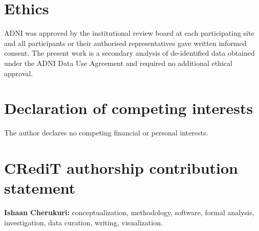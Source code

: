 \documentclass[blue]{ludusofficial}  %
\begin{document}
\section*{Ethics}

ADNI was approved by the institutional review board at each participating site and all participants or their authorised representatives gave written informed consent. The present work is a secondary analysis of de-identified data obtained under the ADNI Data Use Agreement and required no additional ethical approval.

\section*{Declaration of competing interests}

The author declares no competing financial or personal interests.

\section*{CRediT authorship contribution statement}

\textbf{Ishaan Cherukuri:} conceptualization, methodology, software, formal analysis, investigation, data curation, writing, visualization.



\end{document}
